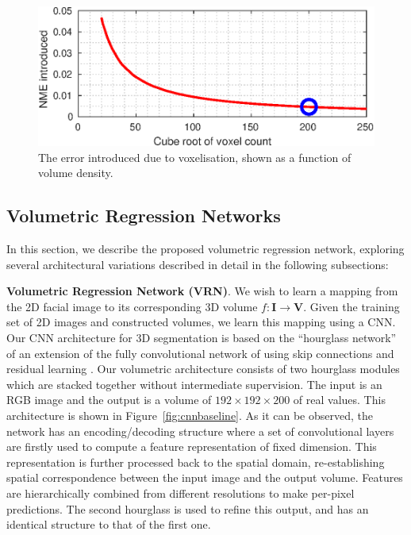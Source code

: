 \begin{figure}
  \centering
  \includegraphics[width=0.9\linewidth]{curves/voxerror.eps}
  \caption[Error due to voxelisation]{The error introduced due to
    voxelisation, shown as a function of volume density.}
  \label{fig:voxerror}
\end{figure}

\subsection{Volumetric Regression Networks}


In this section, we describe the proposed volumetric regression
network, exploring several architectural variations described in
detail in the following subsections:

\textbf{Volumetric Regression Network (VRN)}. We wish to learn a
mapping from the 2D facial image to its corresponding 3D volume
$f: \mathbf{I} \rightarrow \mathbf{V}$. Given the training set of 2D
images and constructed volumes, we learn this mapping using a CNN. Our
CNN architecture for 3D segmentation is based on the ``hourglass
network'' of \cite{newell2016stacked} an extension of the fully
convolutional network of \cite{long2015fully} using skip connections
and residual learning \cite{he2015deep}. Our volumetric architecture
consists of two hourglass modules which are stacked together without
intermediate supervision. The input is an RGB image and the output is
a volume of $192\times 192\times 200$ of real values. This
architecture is shown in Figure~\ref{fig:cnnbaseline}. As it can be
observed, the network has an encoding/decoding structure where a set
of convolutional layers are firstly used to compute a feature
representation of fixed dimension. This representation is further
processed back to the spatial domain, re-establishing spatial
correspondence between the input image and the output volume. Features
are hierarchically combined from different resolutions to make
per-pixel predictions. The second hourglass is used to refine this
output, and has an identical structure to that of the first one.

